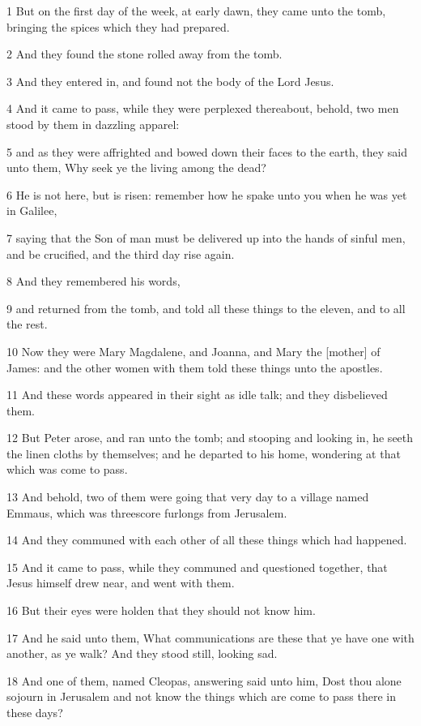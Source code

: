 \par 1 But on the first day of the week, at early dawn, they came unto the tomb, bringing the spices which they had prepared.
\par 2 And they found the stone rolled away from the tomb.
\par 3 And they entered in, and found not the body of the Lord Jesus.
\par 4 And it came to pass, while they were perplexed thereabout, behold, two men stood by them in dazzling apparel:
\par 5 and as they were affrighted and bowed down their faces to the earth, they said unto them, Why seek ye the living among the dead?
\par 6 He is not here, but is risen: remember how he spake unto you when he was yet in Galilee,
\par 7 saying that the Son of man must be delivered up into the hands of sinful men, and be crucified, and the third day rise again.
\par 8 And they remembered his words,
\par 9 and returned from the tomb, and told all these things to the eleven, and to all the rest.
\par 10 Now they were Mary Magdalene, and Joanna, and Mary the [mother] of James: and the other women with them told these things unto the apostles.
\par 11 And these words appeared in their sight as idle talk; and they disbelieved them.
\par 12 But Peter arose, and ran unto the tomb; and stooping and looking in, he seeth the linen cloths by themselves; and he departed to his home, wondering at that which was come to pass.
\par 13 And behold, two of them were going that very day to a village named Emmaus, which was threescore furlongs from Jerusalem.
\par 14 And they communed with each other of all these things which had happened.
\par 15 And it came to pass, while they communed and questioned together, that Jesus himself drew near, and went with them.
\par 16 But their eyes were holden that they should not know him.
\par 17 And he said unto them, What communications are these that ye have one with another, as ye walk? And they stood still, looking sad.
\par 18 And one of them, named Cleopas, answering said unto him, Dost thou alone sojourn in Jerusalem and not know the things which are come to pass there in these days?
